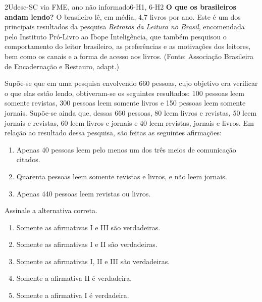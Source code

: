 \begin{questao}{2}{Udesc-SC via FME, ano não informado}{6-H1, 6-H2}\label{u6:udesc22}
\textbf{O que os brasileiros andam lendo?} O brasileiro lê, em média, 4,7 livros por ano. Este é um dos principais resultados da pesquisa \emph{Retratos da Leitura no Brasil}, encomendada pelo Instituto Pró-Livro ao Ibope Inteligência, que também pesquisou o comportamento do leitor brasileiro, as preferências e as motivações dos leitores, bem como os canais e a forma de acesso aos livros. (Fonte: Associação Brasileira de Encadernação e Restauro, adapt.)

Supõe-se que em uma pesquisa envolvendo 660 pessoas, cujo objetivo era verificar o que elas estão lendo, obtiveram-se os seguintes resultados: 100 pessoas leem somente revistas, 300 pessoas leem somente livros e 150 pessoas leem somente jornais. Supõe-se ainda que, dessas 660 pessoas, 80 leem livros e revistas, 50 leem jornais e revistas, 60 leem livros e jornais e 40 leem revistas, jornais e livros. Em relação ao resultado dessa pesquisa, são feitas as seguintes afirmações:
\begin{enumerate}[label=\Roman*.]
  \item Apenas 40 pessoas leem pelo menos um dos três meios de comunicação citados.
  \item Quarenta pessoas leem somente revistas e livros, e não leem jornais.
  \item Apenas 440 pessoas leem revistas ou livros.
\end{enumerate}
Assinale a alternativa correta.
\begin{enumerate}[label=\alph*)]
  \item Somente as afirmativas I e III são verdadeiras.
  \item Somente as afirmativas I e II são verdadeiras.
  \item Somente as afirmativas I, II e III são verdadeiras.
  \item Somente a afirmativa II é verdadeira.
  \item Somente a afirmativa I é verdadeira.
\end{enumerate}
\end{questao}

